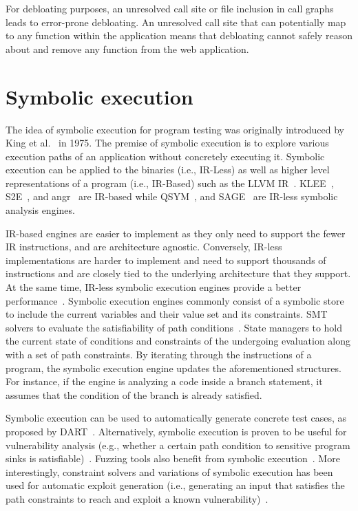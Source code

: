 For debloating purposes, an unresolved call site or file inclusion in call graphs leads to error-prone debloating. 
An unresolved call site that can potentially map to any function within the application means that debloating cannot safely reason about and remove any function from the web application. 

\section{Symbolic execution}

The idea of symbolic execution for program testing was originally introduced by King et al.~\cite{king1976symbolic} in 1975. 
The premise of symbolic execution is to explore various execution paths of an application without concretely executing it. 
Symbolic execution can be applied to the binaries (i.e., IR-Less) as well as higher level representations of a program (i.e., IR-Based) such as the LLVM IR~\cite{llvmir}. 
KLEE~\cite{cadar2008klee}, S2E~\cite{chipounov2009selective}, and angr~\cite{cheng2016binary} are IR-based while QSYM~\cite{yun2018qsym}, and SAGE~\cite{godefroid2012sage} are IR-less symbolic analysis engines. 

IR-based engines are easier to implement as they only need to support the fewer IR instructions, and are architecture agnostic. 
Conversely, IR-less implementations are harder to implement and need to support thousands of instructions and are closely tied to the underlying architecture that they support. 
At the same time, IR-less symbolic execution engines provide a better performance~\cite{poeplau2019systematic}.
Symbolic execution engines commonly consist of a symbolic store to include the current variables and their value set and its constraints. 
SMT solvers to evaluate the satisfiability of path conditions~\cite{moura2008z3}. 
State managers to hold the current state of conditions and constraints of the undergoing evaluation along with a set of path constraints. 
By iterating through the instructions of a program, the symbolic execution engine updates the aforementioned structures. 
For instance, if the engine is analyzing a code inside a branch statement, it assumes that the condition of the branch is already satisfied. 

Symbolic execution can be used to automatically generate concrete test cases, as proposed by DART~\cite{sen2009dart, sen2005cute}. 
Alternatively, symbolic execution is proven to be useful for vulnerability analysis (e.g., whether a certain path condition to sensitive program sinks is satisfiable)~\cite{5504701, wang2009intscope, cha2012unleashing, cadar2008klee}. 
Fuzzing tools also benefit from symbolic execution~\cite{godefroid2012sage}.
More interestingly, constraint solvers and variations of symbolic execution has been used for automatic exploit generation (i.e., generating an input that satisfies the path constraints to reach and exploit a known vulnerability)~\cite{alhuzali2018navex, avgerinos2014automatic}.


